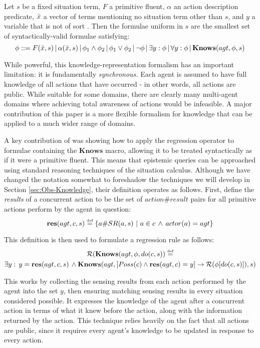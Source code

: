 \begin{defnL}
 Let $s$ be a fixed situation term,
$F$ a primitive fluent, $\alpha$ an action description predicate,
$\bar{x}$ a vector of terms mentioning no situation term other than
$s$, and $y$ a variable that is not of sort . Then
the formulae uniform in $s$ are the smallest set of syntactically-valid
formulae satisfying:\[
\phi::=F(\bar{x},s)\,|\,\alpha(\bar{x},s)\,|\,\phi_{1}\wedge\phi_{2}\,|\,\phi_{1}\vee\phi_{2}\,|\,\neg\phi\,|\,\exists y:\phi\,|\,\forall y:\phi\,|\,\mathbf{Knows}(agt,\phi,s)\]

\end{defnL}
While powerful, this knowledge-representation formalism has an important
limitation: it is fundamentally \emph{synchronous.} Each agent is
assumed to have full knowledge of all actions that have occurred -
in other words, all actions are public. While suitable for some domains,
there are clearly many multi-agent domains where achieving total awareness
of actions would be infeasible. A major contribution of this paper
is a more flexible formalism for knowledge that can be applied to
a much wider range of domains.

A key contribution of \citet{scherl03sc_knowledge} was showing how
to apply the regression operator to formulae containing the $\mathbf{Knows}$
macro, allowing it to be treated syntactically as if it were a primitive
fluent. This means that epistemic queries can be approached using
standard reasoning techniques of the situation calculus. Although
we have changed the notation somewhat to foreshadow the techniques
we will develop in Section \ref{sec:Obs-Knowledge}, their definition
operates as follows. First, define the \emph{results} of a concurrent
action to be the set of $action\#result$ pairs for all primitive
actions perform by the agent in question:\[
\mathbf{res}(agt,c,s)\stackrel{\mbox{\tiny def}}{=}\{a\#SR(a,s)\,\,|\,\, a\in c\,\wedge\, actor(a)=agt\}\]


This definition is then used to formulate a regression rule as follows:\begin{multline}
\mathcal{R}(\mathbf{Knows}(agt,\phi,do(c,s))\stackrel{\mbox{\tiny def}}{=}\\
\exists y:\, y=\mathbf{res}(agt,c,s)\,\wedge\mathbf{Knows}(agt,\left[Poss(c)\wedge\mathbf{res}(agt,c)=y\right]\rightarrow\mathcal{R}(\phi[do(c,s)]),s)\label{eq:reg_k_std}\end{multline}


This works by collecting the sensing results from each action performed
by the agent into the set $y$, then ensuring matching sensing results
in every situation considered possible. It expresses the knowledge
of the agent after a concurrent action in terms of what it knew before
the action, along with the information returned by the action. This
technique relies heavily on the fact that all actions are public,
since it requires every agent's knowledge to be updated in response
to every action.

